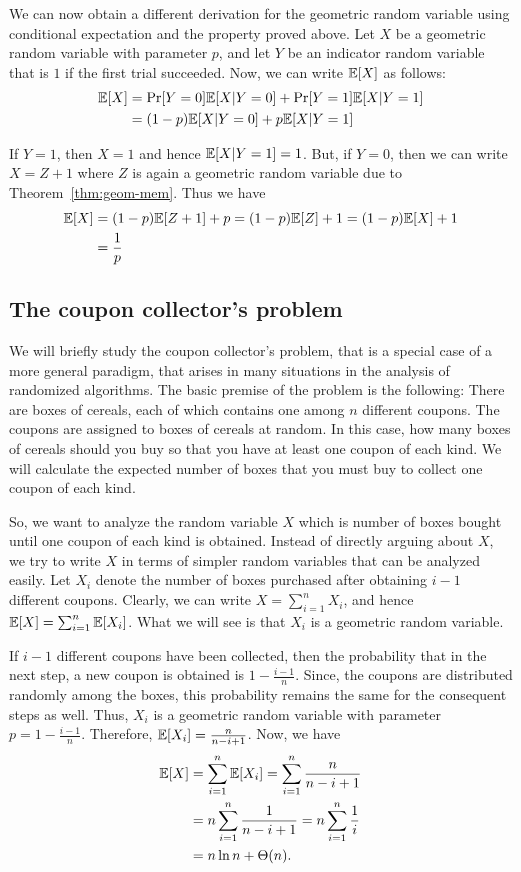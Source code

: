 We can now obtain a different derivation for the geometric random variable using conditional expectation and the property proved above. Let $X$ be a geometric random variable with parameter $p$, and let $Y$ be an indicator random variable that is $1$ if the first trial succeeded. Now, we can write $\mathbb{E}[X]$ as follows:
\begin{align*}
	\mathbb{E}[X] &= \Pr[Y=0]\mathbb{E}[X|Y=0] + \Pr[Y=1]\mathbb{E}[X|Y=1]\\
	&= (1-p)\mathbb{E}[X|Y=0] + p\mathbb{E}[X|Y=1]
\end{align*}

If $Y=1$, then $X=1$ and hence $\mathbb{E}[X|Y=1] =1$. But, if $Y=0$, then we can write $X = Z+1$ where $Z$ is again a geometric random variable due to Theorem~\ref{thm:geom-mem}. Thus we have
\begin{align*}
	\mathbb{E}[X] &= (1-p)\mathbb{E}[Z+1] + p = (1-p)\mathbb{E}[Z] + 1 = (1-p)\mathbb{E}[X] +1\\
	&=\frac{1}{p}
\end{align*}

\subsection{The coupon collector's problem}

We will briefly study the coupon collector's problem, that is a special case of a more general paradigm, that arises in many situations in the analysis of randomized algorithms. The basic premise of the problem is the following: There are boxes of cereals, each of which contains one among $n$ different coupons. The coupons are assigned to boxes of cereals at random. In this case, how many boxes of cereals should you buy so that you have at least one coupon of each kind. We will calculate the expected number of boxes that you must buy to collect one coupon of each kind.

So, we want to analyze the random variable $X$ which is number of boxes bought until one coupon of each kind is obtained. Instead of directly arguing about $X$, we try to write $X$ in terms of simpler random variables that can be analyzed easily. Let $X_i$ denote the number of boxes purchased after obtaining $i-1$ different coupons. Clearly, we can write $X = \sum_{i=1}^{n} X_i$, and hence $\mathbb{E}[X] = \sum_{i=1}^n \mathbb{E}[X_i]$. What we will see is that $X_i$ is a geometric random variable.

If $i-1$ different coupons have been collected, then the probability that in the next step, a new coupon is obtained is $1-\frac{i-1}{n}$. Since, the coupons are distributed randomly among the boxes, this probability remains the same for the consequent steps as well. Thus, $X_i$ is a geometric random variable with parameter $p = 1 - \frac{i-1}{n}$. Therefore, $\mathbb{E}[X_i] = \frac{n}{n-i+1}$. Now, we have
\begin{align*}
	\mathbb{E}[X] &= \sum_{i=1}^n \mathbb{E}[X_i] = \sum_{i=1}^n \frac{n}{n-i+1}\\
	&= n \sum_{i=1}^n \frac{1}{n-i+1} = n\sum_{i=1}^n \frac{1}{i}\\
	&= n\ln n+ \Theta(n).
\end{align*}

